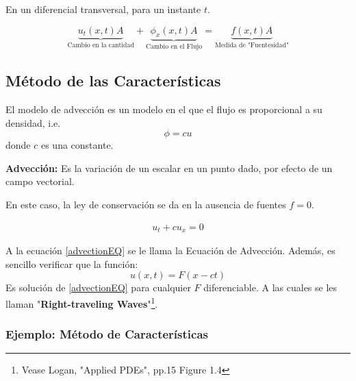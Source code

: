 En un diferencial transversal, para un instante $t$.

	$$\underbrace{u_t (x,t) A}_{\text{Cambio en la cantidad}} + \underbrace{\phi _x (x,t) A}_{\text{Cambio en el Flujo}} = \underbrace{f(x,t) A}_{\text{Medida de "Fuentesidad"}}$$

\subsection{Método de las Características}

El modelo de advección es un modelo en el que el flujo es proporcional a su densidad, i.e.
	$$\phi = cu$$
donde $c$ es una constante. 

\begin{definicion}
	\textbf{Advección: } Es la variación de un escalar en un punto dado, por efecto de un campo vectorial.
\end{definicion}

En este caso, la ley de conservación se da en la ausencia de fuentes $f = 0$.

\begin{align}
	u_t + cu_x = 0 \label{advectionEQ}
\end{align}

A la ecuación \eqref{advectionEQ} se le llama la Ecuación de Advección. Además, es sencillo verificar que la función:
	$$u(x,t) = F(x - ct)$$
Es solución de \eqref{advectionEQ} para cualquier $F$ diferenciable. A las cuales se les llaman "\textbf{Right-traveling Waves}"\footnote{Vease Logan, "Applied PDEs", pp.15 Figure 1.4}. \\

\subsubsection{Ejemplo: Método de Características}

